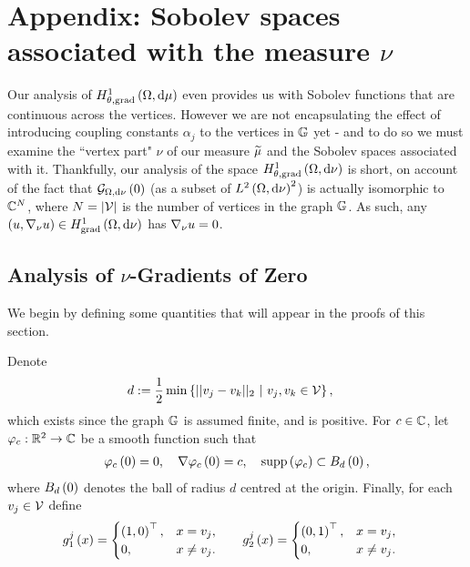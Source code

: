 \section{Appendix: Sobolev spaces associated with the measure $\nu$} \label{app:VertexAnalysis}
Our analysis of $H^1_{\theta, \mathrm{grad}}\left( \Omega, \mathrm{d}\mu \right)$ even provides us with Sobolev functions that are continuous across the vertices.
However we are not encapsulating the effect of introducing coupling constants $\alpha_j$ to the vertices in $\mathbb{G}$ yet - and to do so we must examine the ``vertex part" $\nu$ of our measure $\widetilde{\mu}$ and the Sobolev spaces associated with it.
Thankfully, our analysis of the space $H^1_{\theta, \mathrm{grad}}\left( \Omega, \mathrm{d}\nu \right)$ is short, on account of the fact that $\mathcal{G}_{ \Omega, \mathrm{d}\nu}\left( 0 \right)$ (as a subset of $L^{2}\left( \Omega,\mathrm{d}\nu \right)^2$) is actually isomorphic to $\mathbb{C}^N$, where $N=\left\lvert \mathcal{V} \right\rvert$ is the number of vertices in the graph $\mathbb{G}$.
As such, any $\left( u,\nabla_{\nu}u \right)\in H^1_\mathrm{grad}\left( \Omega, \mathrm{d}\nu \right)$ has $\nabla_{\nu}u=0$.

\subsection{Analysis of $\nu$-Gradients of Zero} \label{appS:VertexGradZero}
We begin by defining some quantities that will appear in the proofs of this section.
\begin{definition} \label{def:UsefulObjects}
	Denote
	\begin{align*}
		d &:= \recip{2}\min\clbracs{\norm{v_j-v_k}_2 \ \vert \ v_j,v_k\in\vertSet},
	\end{align*}
	which exists since the graph $\mathbb{G}$ is assumed finite, and is positive.
	For $c\in\mathbb{C}$, let $\varphi_c:\mathbb{R}^2\rightarrow\mathbb{C}$ be a smooth function such that
	\begin{align*}
		\varphi_c\left( 0 \right) = 0, 
		\quad \nabla\varphi_c\left( 0 \right) = c,
		\quad \mathrm{supp}\left( \varphi_c \right) \subset B_{d}\left( 0 \right),
	\end{align*}
	where $B_{d}\left( 0 \right)$ denotes the ball of radius $d$ centred at the origin.
	Finally, for each $v_j\in\mathcal{V}$ define
	\begin{align*}
		g^j_1\left( x \right) &=
		\begin{cases}
			\left( 1,0 \right)^\top, & x=v_j, \\
			0, & x\neq v_j. \\
		\end{cases}
		&\quad
		g^j_2\left( x \right) &=
		\begin{cases}
			\left( 0,1 \right)^\top, & x=v_j, \\
			0, & x\neq v_j. \\
		\end{cases}
	\end{align*}
\end{definition}

